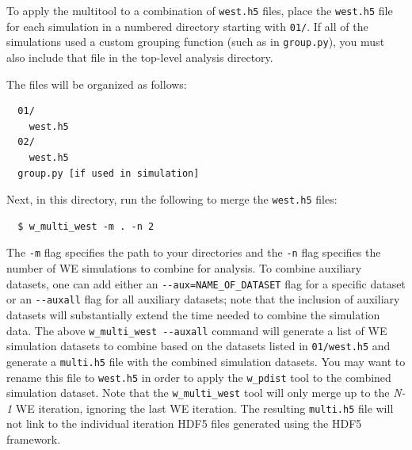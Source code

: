 To apply the multitool to a combination of \verb|west.h5| files, place the \verb|west.h5| file for each simulation in a numbered directory starting with \verb|01/|. 
If all of the simulations used a custom grouping function (such as in \verb|group.py|), you must also include that file in the top-level analysis directory. 

The files will be organized as follows:

\begin{verbatim}
  01/
    west.h5
  02/
    west.h5
  group.py [if used in simulation]
\end{verbatim}

Next, in this directory, run the following to merge the \verb|west.h5| files:
\begin{verbatim}
  $ w_multi_west -m . -n 2
\end{verbatim}

The \verb|-m| flag specifies the path to your directories and the \verb|-n| flag specifies the number of WE simulations to combine for analysis. 
To combine auxiliary datasets, one can add either an \verb|--aux=NAME_OF_DATASET| flag for a specific dataset or an \verb|--auxall| flag for all auxiliary datasets; note that the inclusion of auxiliary datasets will substantially extend the time needed to combine the simulation data. 
The above \verb|w_multi_west --auxall| command will generate a list of WE simulation datasets to combine based on the datasets listed in \verb|01/west.h5| and generate a \verb|multi.h5| file with the combined simulation datasets. 
You may want to rename this file to \verb|west.h5| in order to apply the \verb|w_pdist| tool to the combined simulation dataset. 
Note that the \verb|w_multi_west| tool will only merge up to the \textit{N-1} WE iteration, ignoring the last WE iteration. 
The resulting \verb|multi.h5| file will not link to the individual iteration HDF5 files generated using the HDF5 framework.

